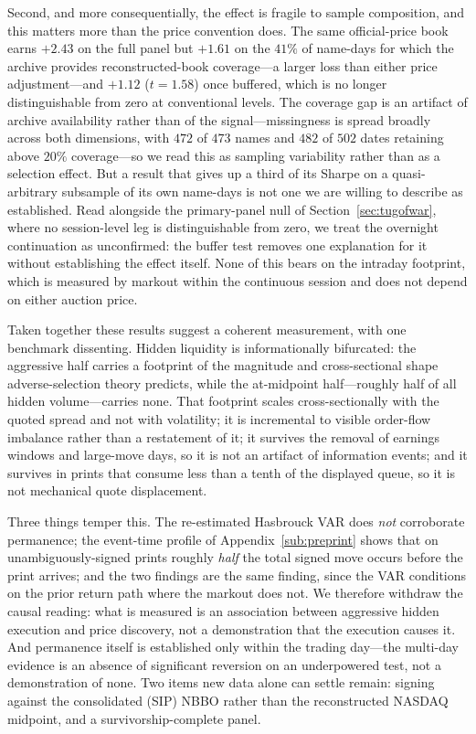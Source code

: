 \documentclass[11pt]{article}
\begin{document}
Second, and more consequentially, the effect is fragile to sample composition, and this
matters more than the price convention does. The same official-price book earns $+2.43$ on
the full panel but $+1.61$ on the $41\%$ of name-days for which the archive provides
reconstructed-book coverage---a larger loss than either price adjustment---and $+1.12$
($t=1.58$) once buffered, which is no longer distinguishable from zero at conventional
levels. The coverage gap is an artifact of archive availability rather than of the
signal---missingness is spread broadly across both dimensions, with $472$ of $473$ names
and $482$ of $502$ dates retaining above $20\%$ coverage---so we read this as sampling
variability rather than as a selection effect. But a result that gives up a third of its
Sharpe on a quasi-arbitrary subsample of its own name-days is not one we are willing to
describe as established. Read alongside the primary-panel null of
Section~\ref{sec:tugofwar}, where no session-level leg is distinguishable from zero, we
treat the overnight continuation as unconfirmed: the buffer test removes one explanation
for it without establishing the effect itself. None of this bears on the intraday
footprint, which is measured by markout within the continuous session and does not depend
on either auction price.

Taken together these results suggest a coherent measurement, with one benchmark dissenting.
Hidden liquidity is informationally bifurcated: the aggressive half carries a footprint of
the magnitude and cross-sectional shape adverse-selection theory predicts, while the
at-midpoint half---roughly half of all hidden volume---carries none. That footprint scales
cross-sectionally with the quoted spread and not with volatility; it is incremental to
visible order-flow imbalance rather than a restatement of it; it survives the removal of
earnings windows and large-move days, so it is not an artifact of information events; and it
survives in prints that consume less than a tenth of the displayed queue, so it is not
mechanical quote displacement.

Three things temper this. The re-estimated Hasbrouck VAR does \emph{not} corroborate
permanence; the event-time profile of Appendix~\ref{sub:preprint} shows that on
unambiguously-signed prints roughly \emph{half} the total signed move occurs before the
print arrives; and the two findings are the same finding, since the VAR conditions on the
prior return path where the markout does not. We therefore withdraw the causal reading:
what is measured is an association between aggressive hidden execution and price discovery,
not a demonstration that the execution causes it. And permanence itself is established only within the trading day---the multi-day
evidence is an absence of significant reversion on an underpowered test, not a demonstration
of none. Two items new data alone can settle remain: signing against the consolidated (SIP)
NBBO rather than the reconstructed NASDAQ midpoint, and a survivorship-complete panel.
\end{document}
